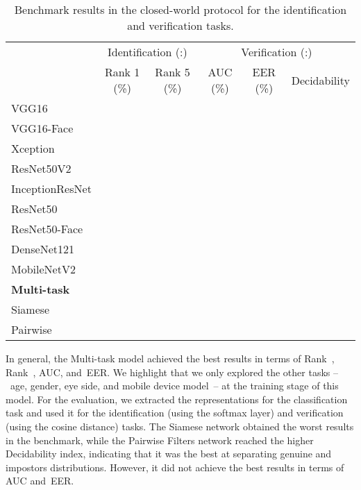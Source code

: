 \documentclass[journal]{IEEEtran}
\begin{document}
\begin{table*}[!ht]
\centering
\caption{Benchmark results in the closed-world protocol for the identification and verification tasks.}
\label{tab:benchclosed}

\vspace{-1.5mm}

\begin{tabular}{@{}lccccc@{}}
\toprule

\centering \multirow{2}{*}{Model} & \multicolumn{2}{c}{Identification (:)} & \multicolumn{3}{c}{Verification (:)}  \\

\cmidrule{2-6}

                   & Rank 1 (\%)     & Rank 5 (\%)     & AUC (\%)           & EER (\%)        & Decidability       \\


\midrule
VGG16              &   &   &   &    &  \\
VGG16-Face         &   &   &   &    &  \\
Xception           &   &   &   &    &  \\
ResNet50V2         &   &   &   &    &  \\
InceptionResNet    &   &   &   &    &  \\
ResNet50           &   &   &   &    &  \\
ResNet50-Face      &   &   &   &    &  \\
DenseNet121        &   &   &   &    &  \\
MobileNetV2        &   &   &   &    &  \\
\midrule
\textbf{Multi-task}& \boldmath{}  & \boldmath{}  & \boldmath{}  & \boldmath{}   &  \\

\midrule
Siamese            &              &              &   &   &   \\
Pairwise           &              &              &   &   & \boldmath{}  \\
\bottomrule
\end{tabular}
\end{table*}

In general, the Multi-task model achieved the best results in terms of Rank~, Rank~, AUC, and~EER.
We highlight that we only explored the other tasks --~age, gender, eye side, and mobile device model~-- at the training stage of this model.
For the evaluation, we extracted the representations for the classification task and used it for the identification (using the softmax layer) and verification (using the cosine distance) tasks.
The Siamese network obtained the worst results in the benchmark, while the Pairwise Filters network reached the higher Decidability index, indicating that it was the best at separating genuine and impostors distributions.
However, it did not achieve the best results in terms of AUC and~EER.
\end{document}
